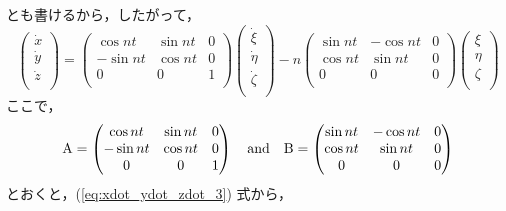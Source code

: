 \documentclass[11pt,a4paper,oneside,onecolumn]{jarticle}
\begin{document}
とも書けるから，したがって，
\begin{equation}
\begin{pmatrix}
\dot{x}\\
\dot{y}\\
\dot{z}\\
\end{pmatrix}
= 
\begin{pmatrix}
\cos nt & \sin nt & 0\\
- \sin nt & \cos nt & 0\\
0 & 0 & 1\\
\end{pmatrix}
\begin{pmatrix}
\dot{\xi}\\
\dot{\eta}\\
\dot{\zeta}\\
\end{pmatrix}
- n
\begin{pmatrix}
\sin nt & - \cos nt & 0\\
\cos nt & \sin nt & 0\\
0 & 0 & 0\\
\end{pmatrix}
\begin{pmatrix}
\xi\\
\eta\\
\zeta\\
\end{pmatrix} \label{eq:xdot_ydot_zdot_3}
\end{equation}
ここで，
\begin{equation}
{\rm A} = 
\begin{pmatrix}
\cos nt & \sin nt & 0\\
- \sin nt & \cos nt & 0\\
0 & 0 & 1\\
\end{pmatrix}
 \quad {\rm and} \quad 
 {\rm B} = 
\begin{pmatrix}
\sin nt & - \cos nt & 0\\
\cos nt & \sin nt & 0\\
0 & 0 & 0\\
\end{pmatrix}
\end{equation}
とおくと，(\ref{eq:xdot_ydot_zdot_3}) 式から，
\end{document}
